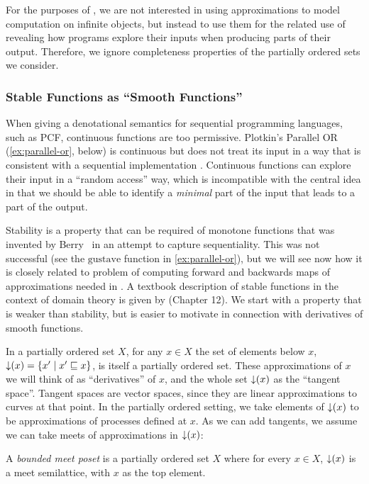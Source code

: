 For the purposes of \GPS, we are not interested in using approximations to model computation on infinite objects, but instead to use them for the related use of revealing how programs explore their inputs when producing parts of their output. Therefore, we ignore completeness properties of the partially ordered sets we consider.

\subsubsection{Stable Functions as ``Smooth Functions''}


When giving a denotational semantics for sequential programming languages, such as PCF, continuous functions are too permissive. Plotkin's Parallel OR (\autoref{ex:parallel-or}, below) is continuous but does not treat its input in a way that is consistent with a sequential implementation \cite{plotkin77lcf}. Continuous functions can explore their input in a ``random access'' way, which is incompatible with the central idea in \GPS that we should be able to identify a \emph{minimal} part of the input that leads to a part of the output.

Stability is a property that can be required of monotone functions that was invented by Berry~\cite{berry79} in an attempt to capture sequentiality. This was not successful (see the $\mathrm{gustave}$ function in \autoref{ex:parallel-or}), but we will see now how it is closely related to problem of computing forward and backwards maps of approximations needed in \GPS. A textbook description of stable functions in the context of domain theory is given by \citet{amadio-curien} (Chapter 12). We start with a property that is weaker than stability, but is easier to motivate in connection with derivatives of smooth functions.

In a partially ordered set $X$, for any $x \in X$ the set of elements below $x$, $\mathop{\downarrow}(x) = \{ x' \mid x' \sqsubseteq x \}$, is itself a partially ordered set. These approximations of $x$ we will think of as ``derivatives'' of $x$, and the whole set $\mathop{\downarrow}(x)$ as the ``tangent space''. Tangent spaces are vector spaces, since they are linear approximations to curves at that point. In the partially ordered setting, we take elements of $\mathop{\downarrow}(x)$ to be approximations of processes defined at $x$. As we can add tangents, we assume we can take meets of approximations in $\mathop{\downarrow}(x)$:

\begin{definition}
  A \emph{bounded meet poset} is a partially ordered set $X$ where for every $x \in X$, $\mathop{\downarrow}(x)$ is a meet semilattice, with $x$ as the top element.
\end{definition}

